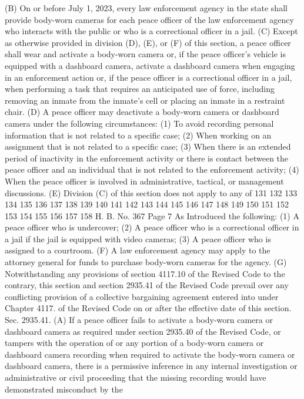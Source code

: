 (B) On or before July 1, 2023, every law enforcement
agency in the state shall provide body-worn cameras for each
peace officer of the law enforcement agency who interacts with
the public or who is a correctional officer in a jail.
(C) Except as otherwise provided in division (D), (E), or
(F) of this section, a peace officer shall wear and activate a
body-worn camera or, if the peace officer's vehicle is equipped
with a dashboard camera, activate a dashboard camera when
engaging in an enforcement action or, if the peace officer is a
correctional officer in a jail, when performing a task that
requires an anticipated use of force, including removing an
inmate from the inmate's cell or placing an inmate in a
restraint chair.
(D) A peace officer may deactivate a body-worn camera or
dashboard camera under the following circumstances:
(1) To avoid recording personal information that is not
related to a specific case;
(2) When working on an assignment that is not related to a
specific case;
(3) When there is an extended period of inactivity in the
enforcement activity or there is contact between the peace
officer and an individual that is not related to the enforcement
activity;
(4) When the peace officer is involved in administrative,
tactical, or management discussions.
(E) Division (C) of this section does not apply to any of
131
132
133
134
135
136
137
138
139
140
141
142
143
144
145
146
147
148
149
150
151
152
153
154
155
156
157
158
H. B. No. 367 Page 7
As Introduced
the following:
(1) A peace officer who is undercover;
(2) A peace officer who is a correctional officer in a
jail if the jail is equipped with video cameras;
(3) A peace officer who is assigned to a courtroom.
(F) A law enforcement agency may apply to the attorney
general for funds to purchase body-worn cameras for the agency.
(G) Notwithstanding any provisions of section 4117.10 of
the Revised Code to the contrary, this section and section
2935.41 of the Revised Code prevail over any conflicting
provision of a collective bargaining agreement entered into
under Chapter 4117. of the Revised Code on or after the
effective date of this section.
 Sec. 2935.41. (A) If a peace officer fails to activate a
body-worn camera or dashboard camera as required under section
2935.40 of the Revised Code, or tampers with the operation of or
any portion of a body-worn camera or dashboard camera recording
when required to activate the body-worn camera or dashboard
camera, there is a permissive inference in any internal
investigation or administrative or civil proceeding that the
missing recording would have demonstrated misconduct by the
